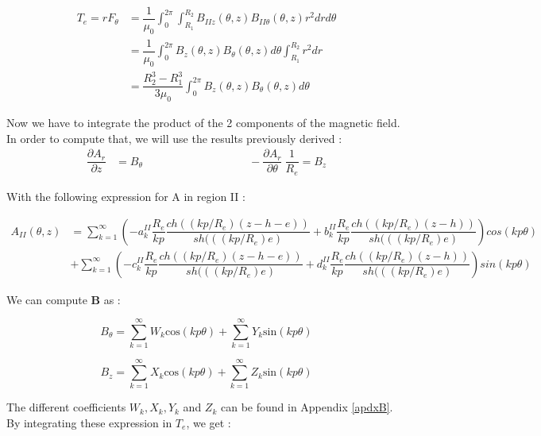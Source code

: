      \begin{align*}
 T_e = rF_{\theta}  &=  \dfrac{1}{\mu_0}\int_0^{2\pi}\int_{R_1}^{R_2}B_{IIz}(\theta,z)B_{II\theta}(\theta,z)r^2drd\theta   \\
&= \dfrac{1}{\mu_0}\int_0^{2\pi}B_z(\theta,z)B_{\theta}(\theta,z)d\theta\int_{R_1}^{R_2}r^2dr   \\
&= \dfrac{R_2^3-R_1^3}{3\mu_0}\int_0^{2\pi}B_z(\theta,z)B_{\theta}(\theta,z)d\theta
\end{align*}
     
Now we have to integrate the product of the 2 components of the magnetic field. In order to compute that, we will use the results previously derived : 
\begin{align*}
 \dfrac{\partial A_r}{\partial z} &= B_{\theta} \hspace{4cm}  - \dfrac{\partial A_r}{\partial \theta}\ \dfrac{1}{R_e} = B_z
\end{align*}

With the following expression for A in region II : 

\begin{align*}
    A_{II}(\theta,z) &= \sum_{k=1}^{\infty} \left(-a_k^{II} \dfrac{R_e}{kp}\dfrac{ch\left((kp/R_e)(z-h-e)\right)}{sh(\left((kp/R_e)e\right)}  + b_k^{II} \dfrac{R_e}{kp}\dfrac{ch\left((kp/R_e)(z-h)\right)}{sh(\left((kp/R_e)e \right)} \right)cos(kp\theta) \\
    &+ \sum_{k=1}^{\infty} \left(-c_k^{II} \dfrac{R_e}{kp}\dfrac{ch\left((kp/R_e)(z-h-e)\right)}{sh(\left((kp/R_e)e\right)}  + d_k^{II} \dfrac{R_e}{kp}\dfrac{ch\left((kp/R_e)(z-h)\right)}{sh(\left((kp/R_e)e \right)} \right)sin(kp\theta)
\end{align*}

We can compute \textbf{B} as : 

\begin{equation*}
    B_{\theta} = \sum_{k=1}^{\infty}W_k \text{cos}(kp\theta) + \sum_{k=1}^{\infty}Y_k \text{sin}(kp\theta)
\end{equation*}



\begin{equation*}
     B_z = \sum_{k=1}^{\infty}X_k \text{cos}(kp\theta) + \sum_{k=1}^{\infty}Z_k \text{sin}(kp\theta)
\end{equation*}

The different coefficients $W_k, X_k, Y_k$ and $Z_k$ can be found in Appendix \ref{apdxB}. By integrating these expression in $T_e$, we get : 

